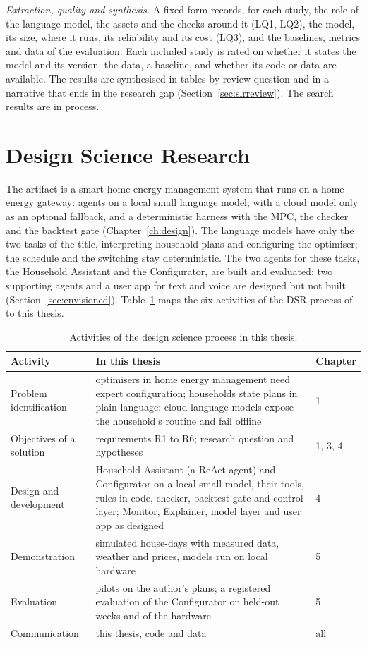 \textit{Extraction, quality and synthesis.} A fixed form records, for each study,
the role of the language model, the assets and the checks around it
(LQ1, LQ2), the model, its size, where it runs, its reliability and its
cost (LQ3), and the baselines, metrics and data of the evaluation. Each
included study is rated on whether it states the model and its version,
the data, a baseline, and whether its code or data are available. The results are synthesised in tables by
review question and in a narrative that ends in the research gap
(Section~\ref{sec:slrreview}). The search results are in process.

\section{Design Science Research}
\label{sec:dsr}

The artifact is a smart home energy management system that runs on a
home energy gateway: agents on a local small language model, with a
cloud model only as an optional fallback, and a deterministic harness
with the MPC, the checker and the backtest gate
(Chapter~\ref{ch:design}). The language models have only the two
tasks of the title, interpreting household plans and configuring the
optimiser; the schedule and the switching stay deterministic. The two
agents for these tasks, the Household Assistant and the Configurator,
are built and evaluated; two supporting agents and a user app for text
and voice are designed but not built (Section~\ref{sec:envisioned}).
Table~\ref{tab:dsrsteps} maps the six activities of the DSR process of
\textcite{peffers2007} to this thesis.

\begin{table}[htbp]
\caption{Activities of the design science process in this thesis.}
\label{tab:dsrsteps}
\small
\begin{tabularx}{\textwidth}{@{}>{\raggedright\arraybackslash}p{3.6cm}Xp{1.8cm}@{}}
\toprule
Activity & In this thesis & Chapter \\
\midrule
Problem identification & optimisers in home energy management need expert configuration; households state plans in plain language; cloud language models expose the household's routine and fail offline & 1 \\
Objectives of a solution & requirements R1 to R6; research question and hypotheses & 1, 3, 4 \\
Design and development & Household Assistant (a ReAct agent) and Configurator on a local small model, their tools, rules in code, checker, backtest gate and control layer; Monitor, Explainer, model layer and user app as designed & 4 \\
Demonstration & simulated house-days with measured data, weather and prices, models run on local hardware & 5 \\
Evaluation & pilots on the author's plans; a registered evaluation of the Configurator on held-out weeks and of the hardware & 5 \\
Communication & this thesis, code and data & all \\
\bottomrule
\end{tabularx}
\end{table}

